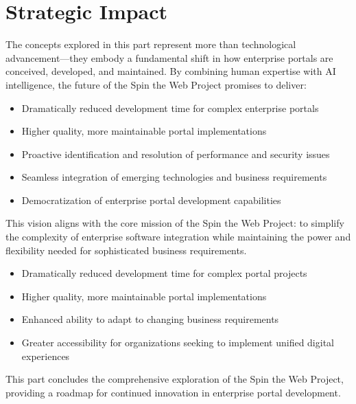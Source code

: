 \section*{Strategic Impact}

The concepts explored in this part represent more than technological advancement—they embody a fundamental shift in how enterprise portals are conceived, developed, and maintained. By combining human expertise with AI intelligence, the future of the Spin the Web Project promises to deliver:

\begin{itemize}
\item Dramatically reduced development time for complex enterprise portals
\item Higher quality, more maintainable portal implementations
\item Proactive identification and resolution of performance and security issues
\item Seamless integration of emerging technologies and business requirements
\item Democratization of enterprise portal development capabilities
\end{itemize}

This vision aligns with the core mission of the Spin the Web Project: to simplify the complexity of enterprise software integration while maintaining the power and flexibility needed for sophisticated business requirements.

\begin{itemize}
\item Dramatically reduced development time for complex portal projects
\item Higher quality, more maintainable portal implementations
\item Enhanced ability to adapt to changing business requirements
\item Greater accessibility for organizations seeking to implement unified digital experiences
\end{itemize}

This part concludes the comprehensive exploration of the Spin the Web Project, providing a roadmap for continued innovation in enterprise portal development.
